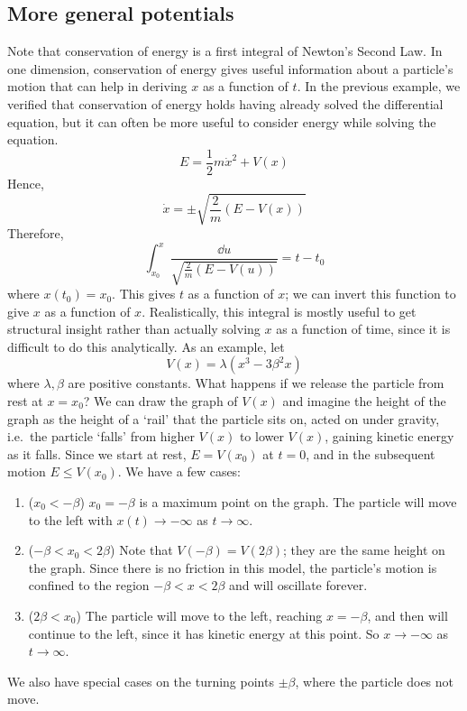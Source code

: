 \subsection{More general potentials}
Note that conservation of energy is a first integral of Newton's Second Law.
In one dimension, conservation of energy gives useful information about a particle's motion that can help in deriving \(x\) as a function of \(t\).
In the previous example, we verified that conservation of energy holds having already solved the differential equation, but it can often be more useful to consider energy while solving the equation.
\[
	E = \frac{1}{2}m\dot x^2 + V(x)
\]
Hence,
\[
	\dot x = \pm \sqrt{\frac{2}{m}(E - V(x))}
\]
Therefore,
\[
	\int_{x_0}^x \frac{\dd{u}}{\sqrt{\frac{2}{m}(E - V(u))}} = t - t_0
\]
where \(x(t_0) = x_0\).
This gives \(t\) as a function of \(x\); we can invert this function to give \(x\) as a function of \(x\).
Realistically, this integral is mostly useful to get structural insight rather than actually solving \(x\) as a function of time, since it is difficult to do this analytically.
As an example, let
\[
	V(x) = \lambda(x^3 - 3 \beta^2 x)
\]
where \(\lambda, \beta\) are positive constants.
What happens if we release the particle from rest at \(x=x_0\)?
We can draw the graph of \(V(x)\) and imagine the height of the graph as the height of a `rail' that the particle sits on, acted on under gravity, i.e.\ the particle `falls' from higher \(V(x)\) to lower \(V(x)\), gaining kinetic energy as it falls.
Since we start at rest, \(E = V(x_0)\) at \(t=0\), and in the subsequent motion \(E \leq V(x_0)\).
We have a few cases:
\begin{enumerate}[{Case} 1:]
	\item (\(x_0 < -\beta\)) \(x_0 = -\beta\) is a maximum point on the graph.
	      The particle will move to the left with \(x(t) \to -\infty\) as \(t \to \infty\).
	\item (\(-\beta < x_0 < 2\beta\)) Note that \(V(-\beta) = V(2\beta)\); they are the same height on the graph.
	      Since there is no friction in this model, the particle's motion is confined to the region \(-\beta < x < 2\beta\) and will oscillate forever.
	\item (\(2\beta < x_0\)) The particle will move to the left, reaching \(x=-\beta\), and then will continue to the left, since it has kinetic energy at this point.
	      So \(x \to -\infty\) as \(t \to \infty\).
\end{enumerate}
We also have special cases on the turning points \(\pm\beta\), where the particle does not move.
